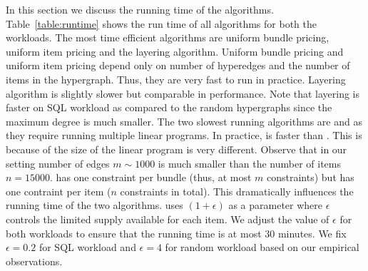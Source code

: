 In this section we discuss the running time of the algorithms. Table~\ref{table:runtime} shows the run time of all algorithms for both the workloads. The most time efficient algorithms are uniform bundle pricing, uniform item pricing and the layering algorithm. Uniform bundle pricing and uniform item pricing depend only on number of hyperedges and the number of items in the hypergraph. Thus, they are very fast to run in practice. Layering algorithm is slightly slower but comparable in performance. Note that layering is faster on SQL workload as compared to the random hypergraphs since the maximum degree is much smaller. The two slowest running algorithms are \lpip and \cip as they require running multiple linear programs. In practice, \lpip is faster than \cip. This is because of the size of the linear program is very different. Observe that in our setting number of edges $m \sim 1000$ is much smaller than the number of items $n = 15000$. \lpip  has one constraint per bundle (thus, at most $m$ constraints) but \cip has one contraint per item ($n$ constraints in total). This dramatically influences the running time of the two algorithms. \cip uses $(1+\epsilon)$ as a parameter where $\epsilon$ controls the limited supply available for each item. We adjust the value of $\epsilon$ for both workloads to ensure that the running time is at most $30$ minutes. We fix $\epsilon = 0.2$ for SQL workload and $\epsilon = 4$ for random workload based on our empirical observations.
